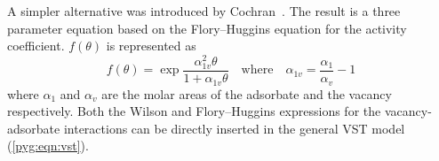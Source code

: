 A simpler alternative was introduced by
Cochran~\cite{cochranVacancySolutionTheory1985}. The result is a
three parameter equation based on the Flory–Huggins equation for the
activity coefficient. \(f(\theta)\) is represented as
%
\begin{equation}\label{pyg:eqn:fhvst}
	f(\theta) =
	\exp{\frac{\alpha^2_{1v}\theta}{1+\alpha_{1v}\theta}}
	\quad \text{where} \quad
	\alpha_{1v} = \frac{\alpha_{1}}{\alpha_{v}} - 1
\end{equation}
%
where \(\alpha_{1}\) and \(\alpha_{v}\) are the molar areas of the
adsorbate and the vacancy respectively.
Both the Wilson and Flory–Huggins expressions for the vacancy-adsorbate
interactions can be directly inserted in the general VST model
(\autoref{pyg:eqn:vst}).
